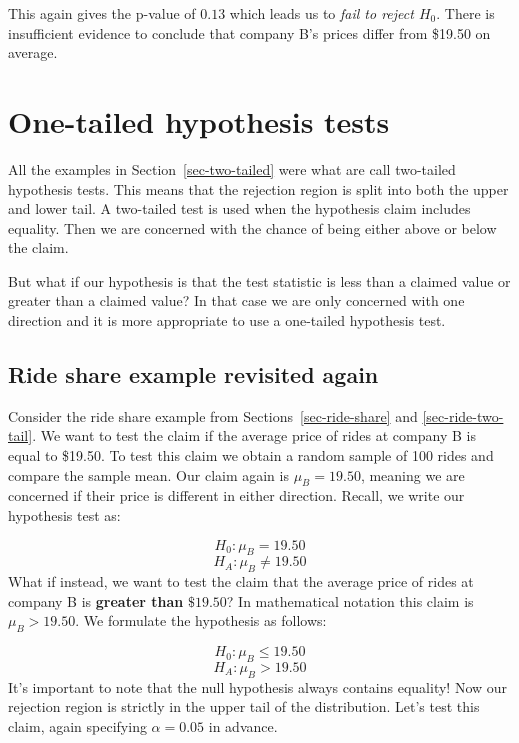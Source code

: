 \documentclass[
  letterpaper,
  DIV=11,
  numbers=noendperiod]{scrreprt}
\theoremstyle{definition}
\theoremstyle{remark}
\begin{document}
This again gives the p-value of \(0.13\) which leads us to \emph{fail to
reject \(H_0\)}. There is insufficient evidence to conclude that company
B's prices differ from \$19.50 on average.

\hypertarget{one-tailed-hypothesis-tests}{%
\section{One-tailed hypothesis
tests}\label{one-tailed-hypothesis-tests}}

All the examples in Section~\ref{sec-two-tailed} were what are call
two-tailed hypothesis tests. This means that the rejection region is
split into both the upper and lower tail. A two-tailed test is used when
the hypothesis claim includes equality. Then we are concerned with the
chance of being either above or below the claim.

But what if our hypothesis is that the test statistic is less than a
claimed value or greater than a claimed value? In that case we are only
concerned with one direction and it is more appropriate to use a
one-tailed hypothesis test.

\hypertarget{ride-share-example-revisited-again}{%
\subsection{Ride share example revisited
again}\label{ride-share-example-revisited-again}}

Consider the ride share example from Sections~\ref{sec-ride-share} and
\ref{sec-ride-two-tail}. We want to test the claim if the average price
of rides at company B is equal to \$19.50. To test this claim we obtain
a random sample of 100 rides and compare the sample mean. Our claim
again is \(\mu_B = 19.50\), meaning we are concerned if their price is
different in either direction. Recall, we write our hypothesis test as:

\[H_0: \mu_B = 19.50\] \[H_A: \mu_B \neq 19.50\] What if instead, we
want to test the claim that the average price of rides at company B is
\textbf{greater than} \(\$19.50\)? In mathematical notation this claim
is \(\mu_B > 19.50\). We formulate the hypothesis as follows:

\[H_0: \mu_B \leq 19.50\] \[H_A: \mu_B > 19.50\] It's important to note
that the null hypothesis always contains equality! Now our rejection
region is strictly in the upper tail of the distribution. Let's test
this claim, again specifying \(\alpha = 0.05\) in advance.
\end{document}
